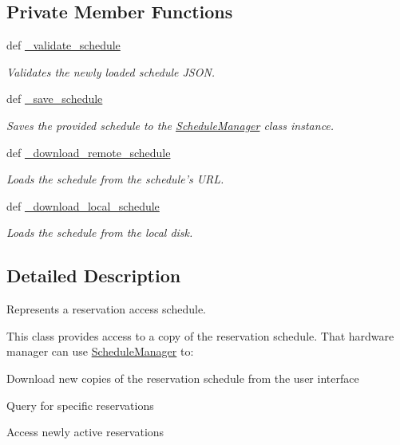 \subsection*{Private Member Functions}
\begin{DoxyCompactItemize}
\item 
def \hyperlink{classhwm_1_1sessions_1_1schedule_1_1_schedule_manager_a022e98a41d6254ab8be51509089c11e2}{\-\_\-validate\-\_\-schedule}
\begin{DoxyCompactList}\small\item\em Validates the newly loaded schedule J\-S\-O\-N. \end{DoxyCompactList}\item 
def \hyperlink{classhwm_1_1sessions_1_1schedule_1_1_schedule_manager_a969595d4ed4ef73bf5709a4910afb548}{\-\_\-save\-\_\-schedule}
\begin{DoxyCompactList}\small\item\em Saves the provided schedule to the \hyperlink{classhwm_1_1sessions_1_1schedule_1_1_schedule_manager}{Schedule\-Manager} class instance. \end{DoxyCompactList}\item 
def \hyperlink{classhwm_1_1sessions_1_1schedule_1_1_schedule_manager_a4eb795805cbf4dd66c7c4774f9c07ea9}{\-\_\-download\-\_\-remote\-\_\-schedule}
\begin{DoxyCompactList}\small\item\em Loads the schedule from the schedule's U\-R\-L. \end{DoxyCompactList}\item 
def \hyperlink{classhwm_1_1sessions_1_1schedule_1_1_schedule_manager_ab40776c55c8d1f12a0d59f55bc716675}{\-\_\-download\-\_\-local\-\_\-schedule}
\begin{DoxyCompactList}\small\item\em Loads the schedule from the local disk. \end{DoxyCompactList}\end{DoxyCompactItemize}


\subsection{Detailed Description}
Represents a reservation access schedule. 

This class provides access to a copy of the reservation schedule. That hardware manager can use \hyperlink{classhwm_1_1sessions_1_1schedule_1_1_schedule_manager}{Schedule\-Manager} to\-:
\begin{DoxyItemize}
\item Download new copies of the reservation schedule from the user interface
\item Query for specific reservations
\item Access newly active reservations 
\end{DoxyItemize}

